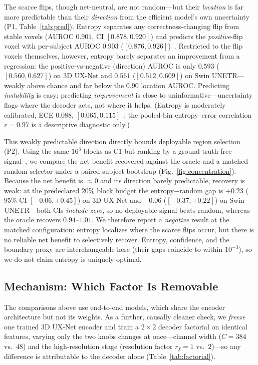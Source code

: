 The scarce flips, though net-neutral, are not random---but their \emph{location} is far
more predictable than their \emph{direction} from the efficient model's own uncertainty
(P1, Table~\ref{tab:pred}).  Entropy separates any correctness-changing flip from stable
voxels (AUROC $0.901$, CI $[0.878,0.920]$) and predicts the \emph{positive}-flip voxel
with per-subject AUROC $0.903$ ($[0.876,0.926]$)~\cite{hendrycks2017baseline}.  Restricted
to the flip voxels themselves, however, entropy barely separates an improvement from a
regression: the positive-vs-negative (direction) AUROC is only $0.593$ ($[0.560,0.627]$)
on 3D UX-Net and $0.561$ ($[0.512,0.609]$) on Swin UNETR---weakly above chance and far
below the $0.90$ location AUROC.  Predicting \emph{instability} is easy; predicting
\emph{improvement} is close to uninformative---uncertainty flags where the decoder acts,
not where it helps.  (Entropy is moderately calibrated,
ECE $0.088$, $[0.065,0.115]$~\cite{guo2017calibration}; the pooled-bin entropy--error
correlation $r=0.97$ is a descriptive diagnostic only.)

This weakly predictable direction directly bounds deployable region selection (P2).
Using the same $16^3$ blocks as C1 but ranking by a ground-truth-free
signal~\cite{geifman2017selective}, we compare the net benefit recovered against the
oracle and a matched-random selector under a paired subject bootstrap
(Fig.~\ref{fig:concentration}).  Because the net benefit is $\approx\!0$ and its direction
barely predictable, recovery is weak: at the predeclared $20\%$ block budget the
entropy$-$random gap is $+0.23$ ($95\%$ CI $[-0.06,+0.45]$) on 3D UX-Net and $-0.06$
($[-0.37,+0.22]$) on Swin UNETR---both CIs \emph{include zero}, so no deployable signal
beats random, whereas the oracle recovers $0.94$--$1.01$.  We therefore report a
\emph{negative} result at the matched configuration: entropy localizes where the scarce
flips occur, but there is no reliable net benefit to selectively recover.  Entropy,
confidence, and the boundary proxy are interchangeable here (their gaps coincide to
within $10^{-3}$), so we do not claim entropy is uniquely optimal.

\subsection{Mechanism: Which Factor Is Removable}
\label{sec:mechanism}

The comparisons above use end-to-end models, which share the encoder architecture but
not its weights. As a further, causally cleaner check, we \emph{freeze} one trained
3D UX-Net encoder and train a $2\times2$ decoder factorial on identical features,
varying only the two knobs \method{} changes at once---channel width ($C{=}384$
vs.\ $48$) and the high-resolution stage (resolution factor $r_f{=}1$ vs.\ $2$)---so any
difference is attributable to the decoder alone (Table~\ref{tab:factorial}).

